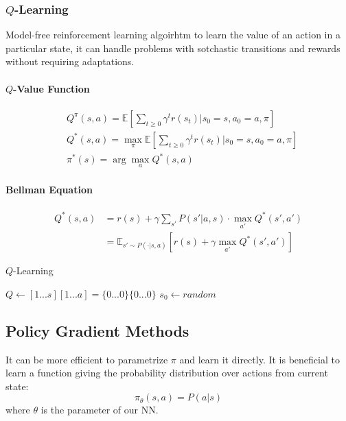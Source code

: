 \documentclass[a4paper,6pt,twocolumn,fleqn]{article}
\begin{document}
\subsubsection{\(Q\)-Learning} %
Model-free reinforcement learning algoirhtm to learn the value of an action in a particular state, it can handle problems with sotchastic transitions and rewards without requiring adaptations.

\paragraph{\(Q\)-Value Function}
\begin{align}
    &Q^\pi (s,a) = \mathbb E \left[ \sum_{t \geq 0} \gamma^t r(s_t) | s_0 = s, a_0 = a, \pi \right]\\
    &Q^*(s,a) = \max_\pi \mathbb E \left[ \sum_{t \geq 0} \gamma^t r(s_t) | s_0 = s, a_0 = a, \pi \right]\\
    &\pi^*(s) = \arg \max_a Q^*(s,a)
\end{align}
\paragraph{Bellman Equation}
\begin{align}
    Q^*(s,a) &= r(s) + \gamma \sum_{s'} P (s' | a,s) \cdot \max_{a'} Q^* (s',a')\\
    &= \mathbb E_{s' \sim P(\cdot | s,a)} [r(s) + \gamma \max_{a'} Q^*(s',a')]
\end{align}

\begin{algorithm}
    \caption{\(Q\)-Learning}
    \label{alg:q_learning}
    $Q \gets [1...s][1...a] = \{0...0\}\{0...0\}$\;
    $s_0 \gets random$\;
     {
    }
\end{algorithm}

\subsection{Policy Gradient Methods} %
It can be more efficient to parametrize \(\pi\) and learn it directly. It is beneficial to learn a function giving the probability distribution over actions from current state:
\begin{equation}
    \pi_\theta (s,a) = P(a|s)
\end{equation}
where \(\theta\) is the parameter of our NN.
\end{document}
